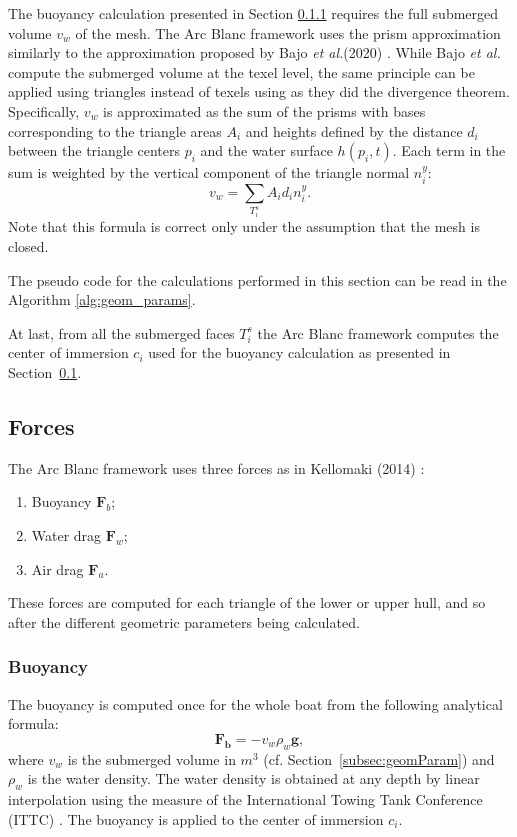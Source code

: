 \documentclass[final]{jcgt}
\def\Framework{The Arc Blanc framework\xspace}
\def\framework{the Arc Blanc framework\xspace}
\def\etal{\emph{et al.}\xspace}
\begin{document}
The buoyancy calculation presented in Section \ref{subsubsec:buoyancy} requires the full submerged volume $v_w$ of the mesh.
\Framework uses the prism approximation similarly to the approximation proposed by Bajo \etal (2020) \cite{bajoRealisticBuoyancyModel2020a}. 
While Bajo \etal compute the submerged volume at the texel level, the same principle can be applied using triangles instead of texels using as they did the divergence theorem. 
Specifically, $v_w$ is approximated as the sum of the prisms with bases corresponding to the triangle areas $A_i$ and heights defined by the distance $d_i$ between the triangle centers $p_i$ and the water surface $h(p_i,t)$. 
Each term in the sum is weighted by the vertical component of the triangle normal $n_i^y$:
\begin{equation}
v_w = \sum_{T_i^s} A_i d_i n_i^y.
\end{equation}
Note that this formula is correct only under the assumption that the mesh is closed.

The pseudo code for the calculations performed in this section can be read in the Algorithm \ref{alg:geom_params}.





At last, from all the submerged faces $T_i^s$ \framework computes the center of immersion $c_i$ used for the buoyancy calculation as presented in Section~\ref{subsec:forces}.

\subsection{Forces}
\label{subsec:forces}
\Framework uses three forces as in Kellomaki (2014) \cite{kellomakiRigidBodyInteraction2014}:
\begin{enumerate}
	\item Buoyancy $\mathbf{F}_b$;
	\item Water drag $\mathbf{F}_w$;
	\item Air drag $\mathbf{F}_a$.
\end{enumerate}
These forces are computed for each triangle of the lower or upper hull, and so after the different geometric parameters being calculated.

\subsubsection{Buoyancy}
\label{subsubsec:buoyancy}
The buoyancy is computed once for the whole boat from the following analytical formula:
\begin{equation}
	\mathbf{F_b} = - v_w \rho_w \mathbf g,
\end{equation}
where $v_w$ is the submerged volume in $m^3$ (cf. Section~\ref{subsec:geomParam}) and $\rho_w$ is the water density.
The water density is obtained at any depth by linear interpolation using the measure of the International Towing Tank Conference (ITTC) \cite{ittcFreshWaterSeawater2011}.
The buoyancy is applied to the center of immersion $c_i$.
\end{document}
